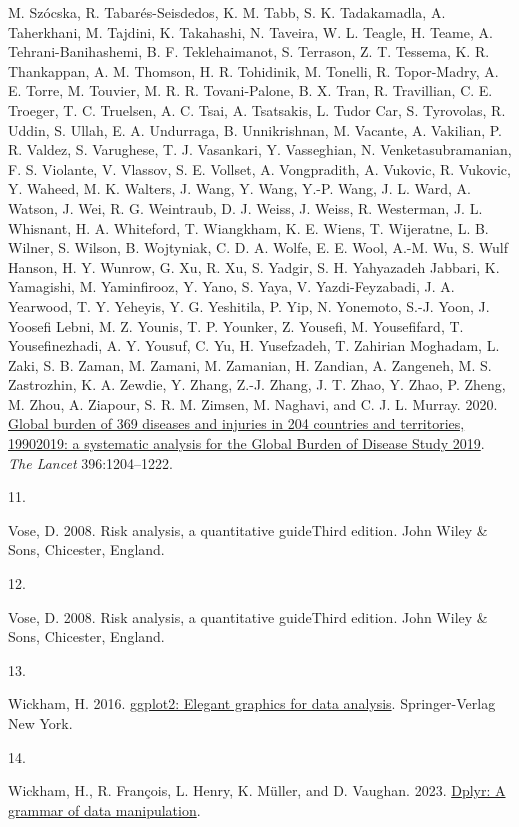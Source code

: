 \documentclass[
  letterpaper,
  DIV=11,
  numbers=noendperiod]{scrartcl}
\newlength{\cslhangindent}
\newlength{\csllabelwidth}
\newenvironment{CSLReferences}[2] %
 {\begin{list}{}{%
  \setlength{\itemindent}{0pt}
  \setlength{\leftmargin}{0pt}
  \setlength{\parsep}{0pt}
  \ifodd #1
   \setlength{\leftmargin}{\cslhangindent}
   \setlength{\itemindent}{-1\cslhangindent}
  \fi
  \setlength{\itemsep}{#2\baselineskip}}}
 {\end{list}}
\newcommand{\CSLLeftMargin}[1]{\parbox[t]{\csllabelwidth}{\strut#1\strut}}
\newcommand{\CSLRightInline}[1]{\parbox[t]{\linewidth - \csllabelwidth}{\strut#1\strut}}
\begin{document}
\begin{CSLReferences}{0}{0}
{M. Szócska, R. Tabarés-Seisdedos, K. M. Tabb, S. K. Tadakamadla, A.
Taherkhani, M. Tajdini, K. Takahashi, N. Taveira, W. L. Teagle, H.
Teame, A. Tehrani-Banihashemi, B. F. Teklehaimanot, S. Terrason, Z. T.
Tessema, K. R. Thankappan, A. M. Thomson, H. R. Tohidinik, M. Tonelli,
R. Topor-Madry, A. E. Torre, M. Touvier, M. R. R. Tovani-Palone, B. X.
Tran, R. Travillian, C. E. Troeger, T. C. Truelsen, A. C. Tsai, A.
Tsatsakis, L. Tudor Car, S. Tyrovolas, R. Uddin, S. Ullah, E. A.
Undurraga, B. Unnikrishnan, M. Vacante, A. Vakilian, P. R. Valdez, S.
Varughese, T. J. Vasankari, Y. Vasseghian, N. Venketasubramanian, F. S.
Violante, V. Vlassov, S. E. Vollset, A. Vongpradith, A. Vukovic, R.
Vukovic, Y. Waheed, M. K. Walters, J. Wang, Y. Wang, Y.-P. Wang, J. L.
Ward, A. Watson, J. Wei, R. G. Weintraub, D. J. Weiss, J. Weiss, R.
Westerman, J. L. Whisnant, H. A. Whiteford, T. Wiangkham, K. E. Wiens,
T. Wijeratne, L. B. Wilner, S. Wilson, B. Wojtyniak, C. D. A. Wolfe, E.
E. Wool, A.-M. Wu, S. Wulf Hanson, H. Y. Wunrow, G. Xu, R. Xu, S.
Yadgir, S. H. Yahyazadeh Jabbari, K. Yamagishi, M. Yaminfirooz, Y. Yano,
S. Yaya, V. Yazdi-Feyzabadi, J. A. Yearwood, T. Y. Yeheyis, Y. G.
Yeshitila, P. Yip, N. Yonemoto, S.-J. Yoon, J. Yoosefi Lebni, M. Z.
Younis, T. P. Younker, Z. Yousefi, M. Yousefifard, T. Yousefinezhadi, A.
Y. Yousuf, C. Yu, H. Yusefzadeh, T. Zahirian Moghadam, L. Zaki, S. B.
Zaman, M. Zamani, M. Zamanian, H. Zandian, A. Zangeneh, M. S.
Zastrozhin, K. A. Zewdie, Y. Zhang, Z.-J. Zhang, J. T. Zhao, Y. Zhao, P.
Zheng, M. Zhou, A. Ziapour, S. R. M. Zimsen, M. Naghavi, and C. J. L.
Murray. 2020.
\href{https://doi.org/10.1016/S0140-6736(20)30925-9}{Global burden of
369 diseases and injuries in 204 countries and territories,
1990{\textendash}2019: a systematic analysis for the Global Burden of
Disease Study 2019}. \emph{The Lancet} 396:1204--1222.}

\CSLLeftMargin{11. }%
\CSLRightInline{Vose, D. 2008. Risk analysis, a quantitative guideThird
edition. John Wiley \& Sons, Chicester, England.}

\CSLLeftMargin{12. }%
\CSLRightInline{Vose, D. 2008. Risk analysis, a quantitative guideThird
edition. John Wiley \& Sons, Chicester, England.}

\CSLLeftMargin{13. }%
\CSLRightInline{Wickham, H. 2016.
\href{https://ggplot2.tidyverse.org}{ggplot2: Elegant graphics for data
analysis}. Springer-Verlag New York.}

\CSLLeftMargin{14. }%
\CSLRightInline{Wickham, H., R. François, L. Henry, K. Müller, and D.
Vaughan. 2023. \href{https://CRAN.R-project.org/package=dplyr}{Dplyr: A
grammar of data manipulation}.}

\end{CSLReferences}
\end{document}
